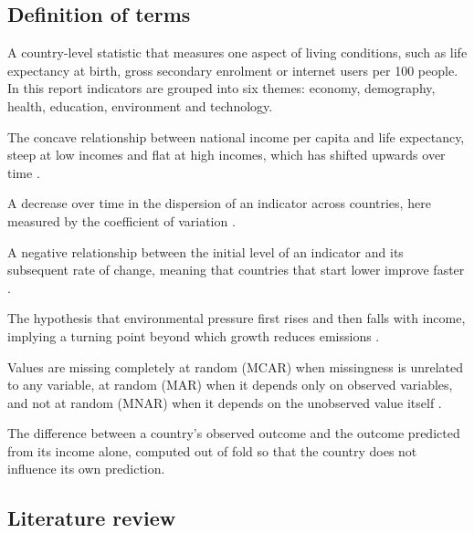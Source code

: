 \documentclass[11pt,a4paper]{article}
\begin{document}
\subsection{Definition of terms}
\begin{description}[leftmargin=0.6cm,style=nextline]
\item[Development indicator] A country-level statistic that measures one aspect of living conditions, such as life expectancy at birth, gross secondary enrolment or internet users per 100 people. In this report indicators are grouped into six themes: economy, demography, health, education, environment and technology.
\item[Preston curve] The concave relationship between national income per capita and life expectancy, steep at low incomes and flat at high incomes, which has shifted upwards over time \cite{preston}.
\item[$\sigma$-convergence] A decrease over time in the dispersion of an indicator across countries, here measured by the coefficient of variation \cite{barro}.
\item[$\beta$-convergence] A negative relationship between the initial level of an indicator and its subsequent rate of change, meaning that countries that start lower improve faster \cite{barro}.
\item[Environmental Kuznets curve] The hypothesis that environmental pressure first rises and then falls with income, implying a turning point beyond which growth reduces emissions \cite{grossman}.
\item[Missing-data mechanisms] Values are missing completely at random (MCAR) when missingness is unrelated to any variable, at random (MAR) when it depends only on observed variables, and not at random (MNAR) when it depends on the unobserved value itself \cite{little}.
\item[Residual (performance relative to income)] The difference between a country's observed outcome and the outcome predicted from its income alone, computed out of fold so that the country does not influence its own prediction.
\end{description}

\subsection{Literature review}
\end{document}
